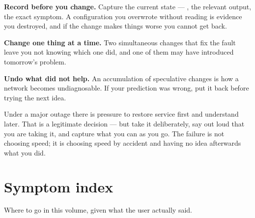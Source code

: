 \begin{tight}
  \item \textbf{Record before you change.} Capture the current state ---
        , the relevant  output, the exact
        symptom. A configuration you overwrote without reading is evidence you
        destroyed, and if the change makes things worse you cannot get back.
  \item \textbf{Change one thing at a time.} Two simultaneous changes that fix
        the fault leave you not knowing which one did, and one of them may have
        introduced tomorrow's problem.
  \item \textbf{Undo what did not help.} An accumulation of speculative changes
        is how a network becomes undiagnosable. If your prediction was wrong,
        put it back before trying the next idea.
\end{tight}

\begin{alertbox}
Under a major outage there is pressure to restore service first and understand
later. That is a legitimate decision --- but take it deliberately, say out loud
that you are taking it, and capture what you can as you go. The failure is not
choosing speed; it is choosing speed by accident and having no idea afterwards
what you did.
\end{alertbox}

\section{Symptom index}\label{sec:symptomindex}

Where to go in this volume, given what the user actually said.

